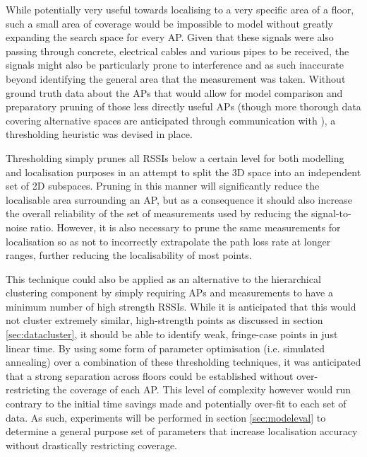 \documentclass{UoYCSproject}
\begin{document}
                While potentially very useful towards localising to a very specific area of a floor, such a small area of coverage would be impossible to model without greatly expanding the search space for every AP. Given that these signals were also passing through concrete, electrical cables and various pipes to be received, the signals might also be particularly prone to interference and as such inaccurate beyond identifying the general area that the measurement was taken. Without ground truth data about the APs that would allow for model comparison and preparatory pruning of those less directly useful APs (though more thorough data covering alternative spaces are anticipated through communication with \citet{JoaquinEmail}), a thresholding heuristic was devised in place.
                
                Thresholding simply prunes all RSSIs below a certain level for both modelling and localisation purposes in an attempt to split the 3D space into an independent set of 2D subspaces. Pruning in this manner will significantly reduce the localisable area surrounding an AP, but as a consequence it should also increase the overall reliability of the set of measurements used by reducing the signal-to-noise ratio. However, it is also necessary to prune the same measurements for localisation so as not to incorrectly extrapolate the path loss rate at longer ranges, further reducing the localisability of most points.
                
                This technique could also be applied as an alternative to the hierarchical clustering component by simply requiring APs and measurements to have a minimum number of high strength RSSIs. While it is anticipated that this would not cluster extremely similar, high-strength points as discussed in section \ref{sec:datacluster}, it should be able to identify weak, fringe-case points in just linear time. By using some form of parameter optimisation (i.e. simulated annealing) over a combination of these thresholding techniques, it was anticipated that a strong separation across floors could be established without over-restricting the coverage of each AP. This level of complexity however would run contrary to the initial time savings made and potentially over-fit to each set of data. As such, experiments will be performed in section \ref{sec:modeleval} to determine a general purpose set of parameters that increase localisation accuracy without drastically restricting coverage.
                
\end{document}
